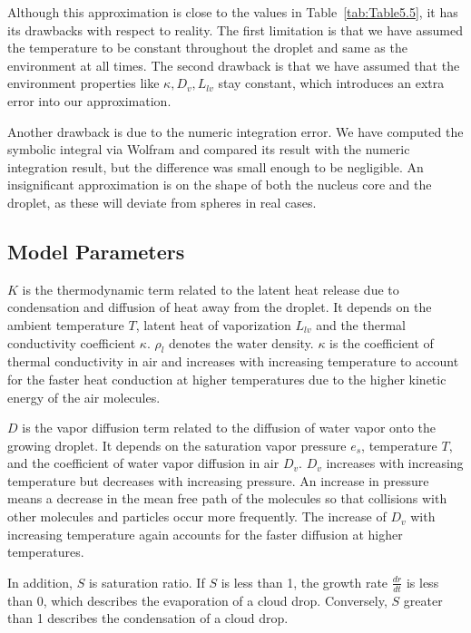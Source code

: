 \documentclass[]{article}
\begin{document}
Although this approximation is close to the values in
Table~\ref{tab:Table5.5}, it has its drawbacks with respect to reality. The
first limitation is that we have assumed the temperature to be constant
throughout the droplet and same as the environment at all times. The second drawback is that
we have assumed that the environment properties like $\kappa, D_{v}, L_{lv}$
stay constant, which introduces an extra error into our approximation.

Another drawback is due to the numeric integration error. We have computed the
symbolic integral via Wolfram and compared its result with the numeric
integration result, but the difference was small enough to be negligible. An
insignificant approximation is on the shape of both the nucleus core and the
droplet, as these will deviate from spheres in real cases.



\subsection{Model Parameters}
$K$ is the thermodynamic term related to the latent heat release due to
condensation and diffusion of heat away from the droplet. It depends on the
ambient temperature $T$, latent heat of vaporization $L_{lv}$ and the thermal
conductivity coefficient $\kappa$. $\rho_l$ denotes the water density.
$\kappa$ is the coefficient of thermal conductivity in air and increases with
increasing temperature to account for the faster heat conduction at higher
temperatures due to the higher kinetic energy of the air molecules.

$D$ is the vapor diffusion term related to the diffusion of water vapor onto
the growing droplet. It depends on the saturation vapor pressure $e_{s}$,
temperature $T$, and the coefficient of water vapor diffusion in air $D_v$.
$D_v$ increases with increasing temperature but decreases with increasing
pressure. An increase in pressure means a decrease in the mean free path of the
molecules so that collisions with other molecules and particles occur more
frequently. The increase of  $D_v$ with increasing temperature again accounts
for the faster diffusion at higher temperatures.

In addition, $S$ is saturation ratio. If $S$ is less than 1, the growth rate
$\frac{dr}{dt}$ is less than 0, which describes the evaporation of a cloud
drop. Conversely, $S$ greater than 1 describes the condensation of a cloud
drop.
\end{document}
